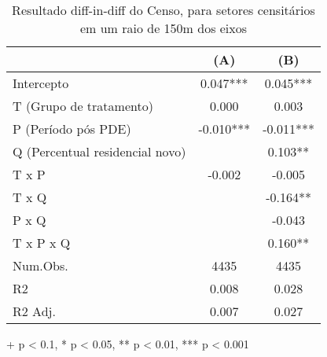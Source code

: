 \begin{table}[!t]
\caption{Resultado diff-in-diff do Censo, para setores censitários em um raio de 150m dos eixos} 
\fontsize{12.0pt}{14.4pt}\selectfont
\begin{tabular*}{\linewidth}{@{\extracolsep{\fill}}lcc}
\toprule
  & (A) & (B) \\ 
\midrule\addlinespace[2.5pt]
Intercepto & 0.047*** & 0.045*** \\ 
T (Grupo de tratamento) & 0.000 & 0.003 \\ 
P (Período pós PDE) & -0.010*** & -0.011*** \\ 
Q (Percentual residencial novo) &  & 0.103** \\ 
T x P & -0.002 & -0.005 \\ 
T x Q &  & -0.164** \\ 
P x Q &  & -0.043 \\ 
{T x P x Q} & {} & {0.160**} \\ 
Num.Obs. & 4435 & 4435 \\ 
R2 & 0.008 & 0.028 \\ 
R2 Adj. & 0.007 & 0.027 \\ 
\bottomrule
\end{tabular*}
\begin{minipage}{\linewidth}
+ p < 0.1, * p < 0.05, ** p < 0.01, *** p < 0.001\\
\end{minipage}
\end{table}

